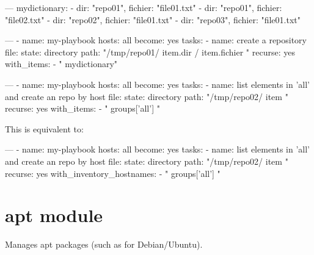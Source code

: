 \documentclass{refcard}
\begin{document}
\begin{yamlbox}[title={group\_vars/all.yml}]
---
mydictionary:
  - {dir: "repo01", fichier: "file01.txt"}
  - {dir: "repo01", fichier: "file02.txt"}
  - {dir: "repo02", fichier: "file01.txt"}
  - {dir: "repo03", fichier: "file01.txt"}
\end{yamlbox}

\begin{yamlbox}[title={playbook with loops and dictionary (in group\_vars)}]
  ---
  - name: my-playbook
    hosts: all
    become: yes
    tasks:
    - name: create a repository
      file: 
        state: directory
        path: "/tmp/repo01/{{ item.dir }}/{{ item.fichier }}"
        recurse: yes
      with_items:
      - "{{ mydictionary}}"
\end{yamlbox}


\begin{yamlbox}[title={playbook with loops and browse items}]
  ---
  - name: my-playbook
    hosts: all
    become: yes
    tasks:
    - name: list elements in 'all' and create an repo by host
      file: 
        state: directory
        path: "/tmp/repo02/{{ item }}"
        recurse: yes
      with_items:
      - "{{ groups['all'] }}"
\end{yamlbox}

This is equivalent to:
\begin{yamlbox}[title={playbook with loops over inventory}]
  ---
  - name: my-playbook
    hosts: all
    become: yes
    tasks:
    - name: list elements in 'all' and create an repo by host
      file: 
        state: directory
        path: "/tmp/repo02/{{ item }}"
        recurse: yes
      with_inventory_hostnames:
      - "{{ groups['all'] }}"
\end{yamlbox}

\section{apt module}

Manages apt packages (such as for Debian/Ubuntu).\\
\end{document}

